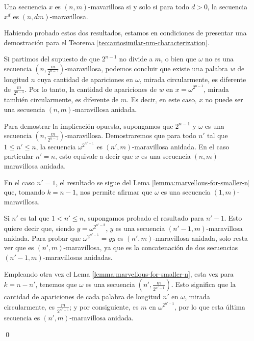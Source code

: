 \documentclass[11pt]{article}
\begin{document}
\begin{lema}
	\label{lemma:marvellous-for-concatenation}
	Una secuencia $x$ es $(n,m)$-mavarillosa si y solo si para todo $d > 0$, la
	secuencia $x^d$ es $(n,dm)$-maravillosa.

\end{lema}

Habiendo probado estos dos resultados, estamos en condiciones de presentar una
demostración para el Teorema \ref{teo:autosimilar-nm-characterization}.

\begin{demo}
	Si partimos del supuesto de que $2^{n-1}$ no divide a $m$, o bien que
	$\omega$ no es una secuencia $\left( n, \frac{m}{2^{n-1}}
		\right)$-maravillosa,
	podemos concluir que existe una palabra $w$ de longitud $n$ cuya
	cantidad de
	apariciones en $\omega$, mirada circularmente, es diferente de
	$\frac{m}{2^{n-1}}$.
	Por lo tanto, la cantidad de apariciones de $w$ en $x = \omega^{2^{n-1}}$,
	mirada también circularmente, es diferente de $m$.
	Es decir, en este caso, $x$ no puede ser una secuencia $(n,m)$-maravillosa
	anidada.


	Para demostrar la implicación opuesta, supongamos que $2^{n-1}$ y $\omega$ es
	una secuencia $\left( n, \frac{m}{2^{n-1}} \right)$-maravillosa.
	Demostraremos que para todo $n'$ tal que $1 \leq n' \leq n$, la secuencia
	$\omega^{2^{n'-1}}$ es $(n',m)$-maravillosa anidada.
	En el caso particular $n' = n$, esto equivale a decir que $x$ es una secuencia
	$(n,m)$-maravillosa anidada.

	En el caso $n' = 1$, el resultado se sigue del Lema
	\ref{lemma:marvellous-for-smaller-n} que, tomando $k = n-1$, nos permite
	afirmar que $\omega$ es una secuencia $(1,m)$-maravillosa.

	Si $n'$ es tal que $1 < n' \leq n$, supongamos probado el resultado para
	$n'-1$.
	Esto quiere decir que, siendo $y = \omega^{2^{n' - 2}}$, $y$ es una secuencia
	$(n'-1, m)$-maravillosa anidada.
	Para probar que $\omega^{2^{n' - 1}} = yy$ es $(n',m)$-maravillosa anidada,
	solo resta ver que es $(n',m)$-maravillosa, ya que es la concatenación de dos
	secuencias $(n'-1, m)$-maravillosas anidadas.

	Empleando otra vez el Lema \ref{lemma:marvellous-for-smaller-n}, esta vez para
	$k = n - n'$, tenemos que $\omega$ es una secuencia $\left( n', \frac{m}{2^{n'
				- 1}} \right)$.
	Esto significa que la cantidad de apariciones de cada palabra de longitud $n'$
	en $\omega$, mirada circularmente, es $\frac{m}{2^{n' - 1}}$; y por
	consiguiente, es $m$ en $\omega^{2^{n'-1}}$, por lo que esta última secuencia
	es $(n',m)$-maravillosa anidada.

	\qed
\end{demo}
\end{document}
